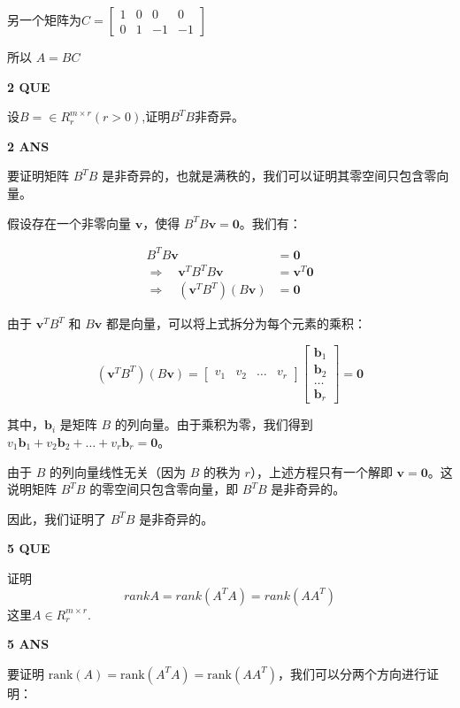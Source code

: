 \documentclass[11pt,letterpaper]{ctexart}
\begin{document}
\begin{enumerate}
另一个矩阵为$C =  \begin{bmatrix}
	1 & 0 & 0 & 0 \\
	0 & 1 & -1 & -1 
\end{bmatrix}$

所以 $A = BC$

\textbf{2 QUE}
\bigskip

设$B = \in R_r^{m \times r}(r > 0)$,证明$B^TB$非奇异。

\textbf{2 ANS}
\bigskip

要证明矩阵 $B^TB$ 是非奇异的，也就是满秩的，我们可以证明其零空间只包含零向量。

假设存在一个非零向量 $\mathbf{v}$，使得 $B^TB\mathbf{v} = \mathbf{0}$。我们有：

\[
\begin{aligned}
B^TB\mathbf{v} &= \mathbf{0} \\
\Rightarrow \quad \mathbf{v}^TB^TB\mathbf{v} &= \mathbf{v}^T\mathbf{0} \\
\Rightarrow \quad (\mathbf{v}^TB^T)(B\mathbf{v}) &= \mathbf{0}
\end{aligned}
\]

由于 $\mathbf{v}^TB^T$ 和 $B\mathbf{v}$ 都是向量，可以将上式拆分为每个元素的乘积：

\[
(\mathbf{v}^TB^T)(B\mathbf{v}) = \begin{bmatrix} v_1 & v_2 & \ldots & v_r \end{bmatrix} \begin{bmatrix} \mathbf{b}_1 \\ \mathbf{b}_2 \\ \ldots \\ \mathbf{b}_r \end{bmatrix} = \mathbf{0}
\]

其中，$\mathbf{b}_i$ 是矩阵 $B$ 的列向量。由于乘积为零，我们得到 $v_1\mathbf{b}_1 + v_2\mathbf{b}_2 + \ldots + v_r\mathbf{b}_r = \mathbf{0}$。

由于 $B$ 的列向量线性无关（因为 $B$ 的秩为 $r$），上述方程只有一个解即 $\mathbf{v} = \mathbf{0}$。这说明矩阵 $B^TB$ 的零空间只包含零向量，即 $B^TB$ 是非奇异的。

因此，我们证明了 $B^TB$ 是非奇异的。


\textbf{5 QUE}
\bigskip

证明 \[ rankA = rank(A^TA) = rank(AA^T)\]
这里$A \in R_r^{m \times r}$.

\textbf{5 ANS}
\bigskip


要证明 $\text{rank}(A) = \text{rank}(A^TA) = \text{rank}(AA^T)$，我们可以分两个方向进行证明：


\end{enumerate}
\end{document}
